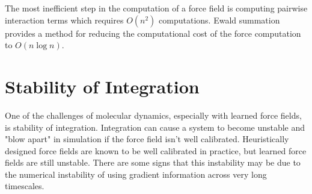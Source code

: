 \documentclass[book.tex]{subfiles}
\begin{document}
The most inefficient step in the computation of a force field is computing pairwise interaction terms which requires $O(n^2)$ computations. Ewald summation provides a method for reducing the computational cost of the force computation to $O(n \log n)$.

\section{Stability of Integration}


One of the challenges of molecular dynamics, especially with learned force fields, is stability of integration. Integration can cause a system to become unstable and "blow apart" in simulation if the force field isn't well calibrated. Heuristically designed force fields are known to be well calibrated in practice, but learned force fields are still unstable. There are some signs that this instability may be due to the numerical instability of using gradient information across very long timescales.

\end{document}
